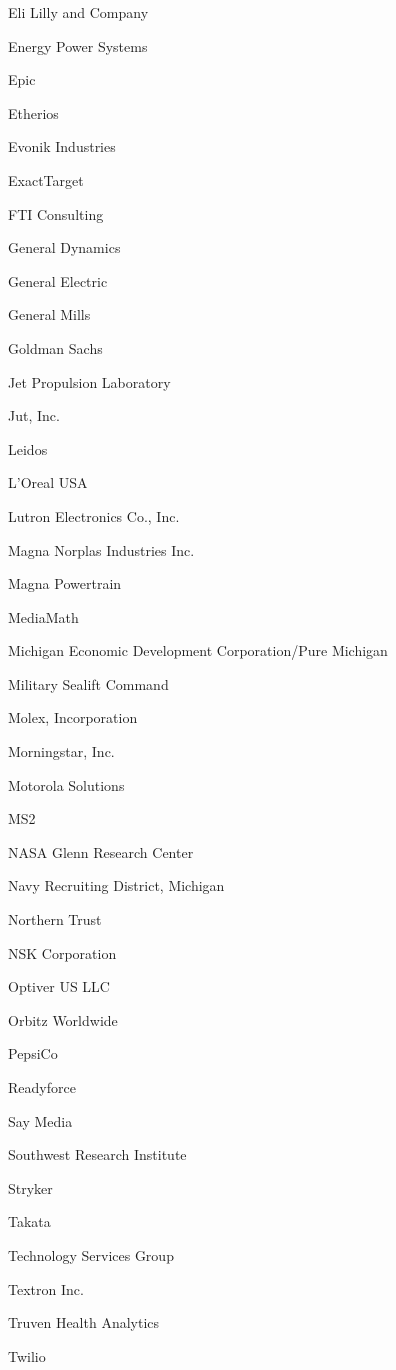 \documentclass[twoside]{article}
\begin{document}
\begin{center}
\begin{multicols}{5}
\begin{FlushLeft}
\begin{compactitem}
\item Eli Lilly and Company
\item Energy Power Systems
\item Epic
\item Etherios
\item Evonik Industries
\item ExactTarget
\item FTI Consulting
\item General Dynamics
\item General Electric
\item General Mills
\item Goldman Sachs
\item Jet Propulsion Laboratory
\item Jut, Inc.
\item Leidos
\item L'Oreal USA
\item Lutron Electronics Co., Inc.
\item Magna Norplas Industries Inc.
\item Magna Powertrain
\item MediaMath
\item Michigan Economic Development Corporation/Pure Michigan
\item Military Sealift Command
\item Molex, Incorporation
\item Morningstar, Inc.
\item Motorola Solutions
\item MS2
\item NASA Glenn Research Center
\item Navy Recruiting District, Michigan
\item Northern Trust
\item NSK Corporation
\item Optiver US LLC
\item Orbitz Worldwide
\item PepsiCo
\item Readyforce
\item Say Media
\item Southwest Research Institute
\item Stryker
\item Takata
\item Technology Services Group
\item Textron Inc.
\item Truven Health Analytics
\item Twilio

\end{compactitem}
\end{FlushLeft}
\end{multicols}
\end{center}
\end{document}
